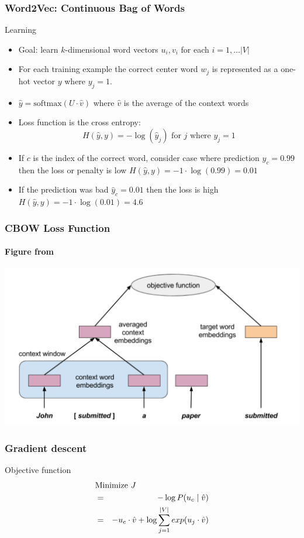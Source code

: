 \begin{frame}
\frametitle{Word2Vec: Continuous Bag of Words}
\begin{block}{Learning}
\begin{itemize}[<+->]
	\item Goal: learn $k$-dimensional word vectors $u_i, v_i$ for each $i = 1, \ldots |V|$
	\item For each training example the correct center word $w_j$ is represented as a one-hot vector $y$ where $y_j = 1$.
	\item $\hat{y} = \textrm{softmax}(U \cdot \hat{v})$ where $\hat{v}$ is the average of the context words
	\item Loss function is the cross entropy:
	\[ H(\hat{y}, y) = - \log(\hat{y}_j) \textrm{ for $j$ where $y_j = 1$} \]
	\item If $c$ is the index of the correct word, consider case where prediction $\hat{y}_c = 0.99$ then the loss or penalty is low $H(\hat{y}, y) = - 1 \cdot \log(0.99) = 0.01$
	\item If the prediction was bad $\hat{y}_c = 0.01$ then the loss is high $H(\hat{y}, y) = - 1 \cdot \log(0.01) = 4.6$
\end{itemize}	
\end{block}
\end{frame}

\begin{frame}
\frametitle{CBOW Loss Function}
\framesubtitle{Figure from \cite{melamud16}}
\includegraphics[scale=.45]{figures/wordvectors/cbowloss}	
\end{frame}

\begin{frame}
\frametitle{Gradient descent}
\begin{block}{Objective function}
\begin{eqnarray*}
\lefteqn{\textrm{Minimize } J } \\
& = & - \log P(u_c \mid \hat{v}) \\
& = & - u_c \cdot \hat{v} + \log \sum_{j=1}^{|V|} exp(u_j \cdot \hat{v})
\end{eqnarray*}
\end{block}
\end{frame}


